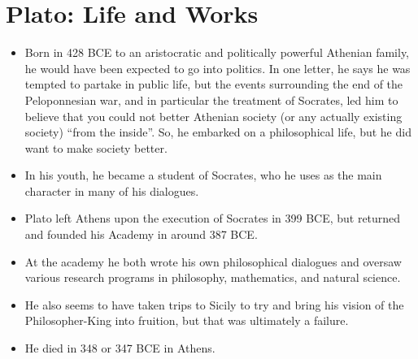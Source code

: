 \documentclass[oneside]{article}
\begin{document}
\thispagestyle{fancy}

\section*{Plato: Life and Works}
\begin{itemize}
\item{Born in 428 BCE to an aristocratic and politically powerful Athenian family, he would have been expected to go into politics. In one letter, he says he was tempted to partake in public life, but the events surrounding the end of the Peloponnesian war, and in particular the treatment of Socrates, led him to believe that you could not better Athenian society (or any actually existing society) ``from the inside''. So, he embarked on a philosophical life, but he did want to make society better.}\item{In his youth, he became a student of Socrates, who he uses as the main character in many of his dialogues.}
\item{Plato left Athens upon the execution of Socrates in 399 BCE, but returned and founded his Academy in around 387 BCE.}
\item{At the academy he both wrote his own philosophical dialogues and oversaw various research programs in philosophy, mathematics, and natural science.}
\item{He also seems to have taken trips to Sicily to try and bring his vision of the Philosopher-King into fruition, but that was ultimately a failure.}
\item{He died in 348 or 347 BCE in Athens.}
\end{itemize}
\end{document}
